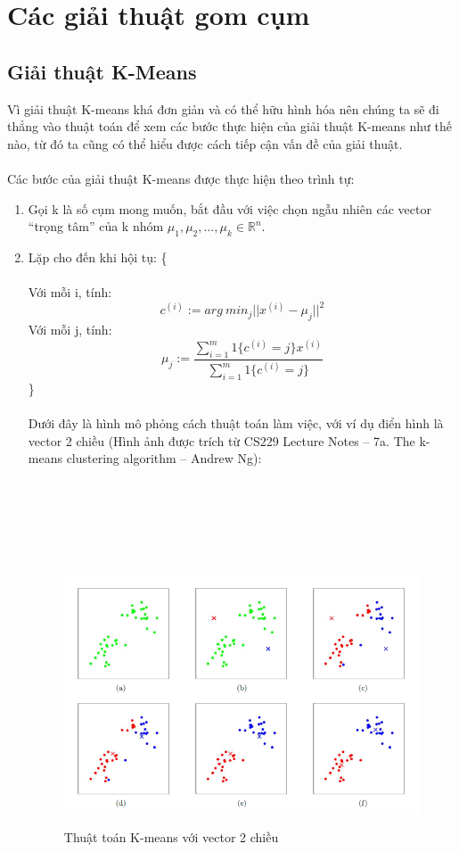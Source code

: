 \chapter{Các giải thuật gom cụm}
\section{Giải thuật K-Means}
Vì giải thuật K-means khá đơn giản và có thể hữu hình hóa nên chúng ta sẽ đi
thẳng vào thuật toán để xem các bước thực hiện của giải thuật K-means như thế
nào, từ đó ta cũng có thể hiểu được cách tiếp cận vấn đề của giải
thuật.\\\\ 
 Các bước của giải thuật K-means được thực hiện theo trình tự:
\begin{enumerate}
  \item Gọi k là số cụm mong muốn, bắt đầu với việc chọn ngẫu nhiên các
  vector ``trọng tâm'' của k nhóm $\mu_1,\mu_2,\dots, \mu_k \in \mathbb{R} ^n $.
  \item Lặp cho đến khi hội tụ: \{ \\\\
  Với mỗi i, tính:
  \[ c^{(i)} := arg\:min_j||x^{(i)} - \mu_j||^2 \]
  Với mỗi j, tính:
  \[ \mu_j
  :=\frac{\sum_{i=1}^{m}1\{c^{(i)}=j\}x^{(i)}}{\sum_{i=1}^{m}1\{c^{(i)}=j\}}
  \]
  \}\\\\
  Dưới đây là hình mô phỏng cách thuật toán làm việc, với ví dụ điển hình là
  vector 2 chiều (Hình ảnh được trích từ CS229 Lecture Notes – 7a. The k-means
  clustering algorithm – Andrew Ng):\\\\\\\\\\\\
  \begin{figure}[h!]
  	\centering
	\includegraphics[width=7in,height=3in,keepaspectratio=true]{kmeans.png}
	\caption{Thuật toán K-means với vector 2 chiều}
  \end{figure}
  

\end{enumerate}
